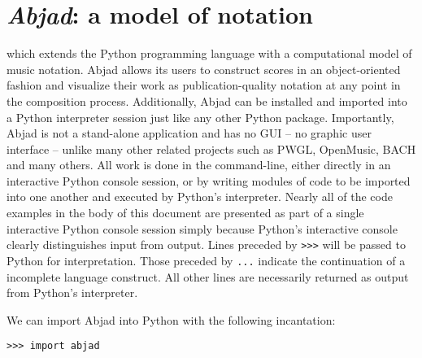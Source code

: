 \chapter{\emph{Abjad}: a model of notation}
\label{chap:a-model-of-notation}

 which extends the Python
programming language with a computational model of music notation. Abjad allows
its users to construct scores in an object-oriented fashion and visualize their
work as publication-quality notation at any point in the composition process.
Additionally, Abjad can be installed and imported into a Python interpreter
session just like any other Python package. Importantly, Abjad is not a
stand-alone application and has no GUI -- no graphic user interface -- unlike
many other related projects such as PWGL\cite{laurson2009qf,
kuuskankare2004recent}, OpenMusic\cite{assayag1999sw},
BACH\cite{agostini2013real} and many others. All work is done in the
command-line, either directly in an interactive Python console session, or by
writing modules of code to be imported into one another and executed by
Python's interpreter. Nearly all of the code examples in the body of this
document are presented as part of a single interactive Python console session
simply because Python's interactive console clearly distinguishes input from
output. Lines preceded by \texttt{>>>} will be passed to Python for
interpretation. Those preceded by \texttt{...} indicate the continuation of a
incomplete language construct. All other lines are necessarily returned as
output from Python's interpreter.



We can import Abjad into Python with the following incantation:

\begin{comment}
<abjad>
import abjad
</abjad>
\end{comment}

\begin{abjadbookoutput}
\begin{singlespacing}
\vspace{-0.5\baselineskip}
\begin{verbatim}
>>> import abjad
\end{verbatim}
\end{singlespacing}
\end{abjadbookoutput}

